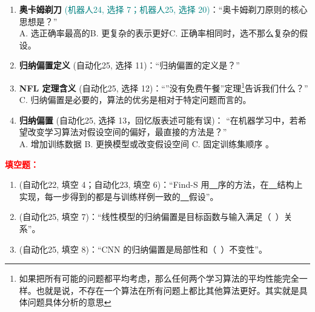 ﻿\documentclass[../main.tex]{subfiles}
\begin{document}
\begin{enumerate}[itemsep=0.45em, topsep=0.2em, leftmargin=1.5em]
    \item \textbf{奥卡姆剃刀} \textcolor{teal}{(机器人24, 选择 7；机器人25, 选择 20)}：``奥卡姆剃刀原则的核心思想是？''\\
    A. 选正确率最高的\quad B. 更复杂的表示更好\quad C. 正确率相同时，选不那么复杂的假设\quad {}。 

    \item \textbf{归纳偏置定义} \textcolor{autoclassgreen}{(自动化25, 选择 11)}：``归纳偏置的定义是？''\\
     

    \item \textbf{NFL 定理含义} \textcolor{autoclassgreen}{(自动化25, 选择 12)}：``''没有免费午餐''定理\footnote{如果把所有可能的问题都平均考虑，那么任何两个学习算法的平均性能完全一样。也就是说，不存在一个算法在所有问题上都比其他算法更好。其实就是具体问题具体分析的意思}告诉我们什么？''\\
    \quad {}\quad C. 归纳偏置是必要的，算法的优劣是相对于特定问题而言的\quad {}。 

    \item \textbf{归纳偏置} \textcolor{autoclassgreen}{(自动化25, 选择 13，回忆版表述可能有误)}：
    ``在机器学习中，若希望改变学习算法对假设空间的偏好，最直接的方法是？''\\
    A. 增加训练数据\quad
    B. 更换模型或改变假设空间\quad
    C. 固定训练集顺序\quad
    。
\end{enumerate}

\noindent\textbf{\textcolor{red}{填空题：}}
\begin{enumerate}[itemsep=0.3em, topsep=0.2em, leftmargin=1.5em]
    \item \textcolor{autoclassgreen}{(自动化22, 填空 4；自动化23, 填空 6)}：``Find-S 用\underline{\ \ }序的方法，在\underline{\ \ }结构上实现，每一步得到的都是与训练样例一致的\underline{\ \ }假设''。 
    \item \textcolor{autoclassgreen}{(自动化25, 填空 7)}：``线性模型的归纳偏置是目标函数与输入满足（\ ）关系''。 
    \item \textcolor{autoclassgreen}{(自动化25, 填空 8)}：``CNN 的归纳偏置是局部性和（\ ）不变性''。 
\end{enumerate}
\end{document}

